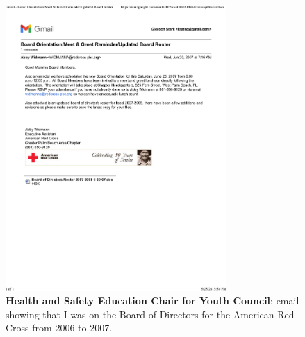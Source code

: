 \begin{figure}[h!]
	\centering
	\caption{\textbf{Health and Safety Education Chair for Youth Council}: email showing that I was on the Board of Directors for the American Red Cross from 2006 to 2007.}
	\includegraphics[width=0.75\textwidth]{attachments/G-outreach/redCrossBoardOfDirectors}
\end{figure}



